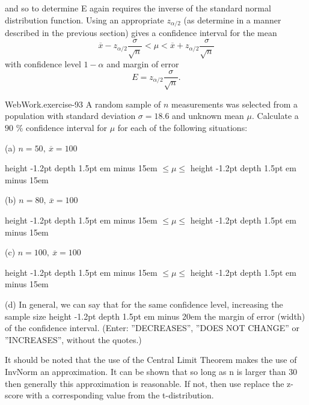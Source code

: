 \documentclass[10pt,]{book}
\newcommand{\fillin}[1]{\leavevmode\leaders\vrule height -1.2pt depth 1.5pt \hskip #1em minus #1em \null}
\numberwithin{equation}{section}
\newcommand{\lt}{<}
\begin{document}
and so to determine E again requires the inverse of the standard normal distribution function.  Using an appropriate \(z_{\alpha /2}\) (as determine in a manner described in the previous section) gives a confidence interval for the mean%
\begin{equation*}
\overline{x} - z_{\alpha / 2} \frac{\sigma}{\sqrt{n}} \lt \mu \lt \overline{x} + z_{\alpha / 2} \frac{\sigma}{\sqrt{n}}
\end{equation*}
with confidence level \(1-\alpha\) and margin of error%
\begin{equation*}
E = z_{\alpha /2} \frac{\sigma}{\sqrt{n}}.
\end{equation*}
%
\par
\hypertarget{p-1377}{}%
\begin{inlineexercise}{WebWork.}{exercise-93}%
\hypertarget{p-1378}{}%
A random sample of \(n\) measurements was selected from a population with standard deviation \(\sigma = 18.6\) and unknown mean \(\mu\). Calculate a \(90\) \% confidence interval for \(\mu\) for each of the following situations:%
\par
\hypertarget{p-1379}{}%
(a) \(n = 50, \ \overline{x} = 100\)%
\par
\hypertarget{p-1380}{}%
 \fillin{15} \(\leq \mu \leq\)  \fillin{15}%
\par
\hypertarget{p-1381}{}%
(b)  \(n = 80, \ \overline{x} = 100\)%
\par
\hypertarget{p-1382}{}%
 \fillin{15} \(\leq \mu \leq\)  \fillin{15}%
\par
\hypertarget{p-1383}{}%
(c)  \(n = 100, \ \overline{x} = 100\)%
\par
\hypertarget{p-1384}{}%
 \fillin{15} \(\leq \mu \leq\)  \fillin{15}%
\par
\hypertarget{p-1385}{}%
(d)  In general, we can say that for the same confidence level, increasing the sample size  \fillin{20} the margin of error (width) of the confidence interval.  (Enter: ''DECREASES'', ''DOES NOT CHANGE'' or ''INCREASES'', without the quotes.)%
\end{inlineexercise}
%
\par
\hypertarget{p-1386}{}%
It should be noted that the use of the Central Limit Theorem makes the use of  InvNorm an approximation. It can be shown that so long as n is larger than 30 then generally this approximation is reasonable. If not, then use replace the z-score with a corresponding value from the t-distribution.%
\par
\hypertarget{p-1387}{}%
\end{document}
